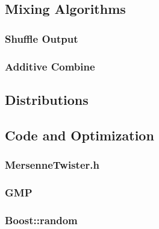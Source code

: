 \documentclass{scrartcl}
\begin{document}
\subsection{Mixing Algorithms}
\subsubsection{Shuffle Output}
\subsubsection{Additive Combine}
\subsection{Distributions}
\subsection{Code and Optimization}
\subsubsection{MersenneTwister.h}
\subsubsection{GMP}
\subsubsection{Boost::random}
\end{document}
